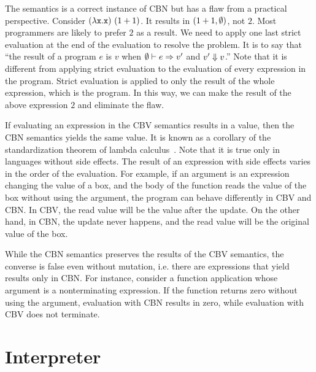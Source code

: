 The semantics is a correct instance of CBN but has a flaw from a practical
perspective. Consider $(\lambda\texttt{x}.\texttt{x})\ (1+1)$. It results in
$(1+1,\emptyset)$, not $2$. Most programmers are likely to prefer
$2$ as a result. We need to apply one last strict evaluation at the end of the
evaluation to resolve the problem. It is to say that ``the result of a program
$e$ is $v$ when $\emptyset\vdash e\Rightarrow v'$ and $v'\Downarrow v$.'' Note that it is
different from applying strict evaluation to the evaluation of every expression
in the program. Strict evaluation is applied to only the result of the whole
expression, which is the program. In this way, we can make the result of the
above expression $2$ and eliminate the flaw.

If evaluating an expression in the CBV semantics results in a value,
then the CBN semantics yields the same value. It is known as a corollary of the
standardization theorem of lambda calculus~\cite{theories-of-pl}.
Note that it is true only in languages without side effects.
The result of an expression with side effects varies in the order of
the evaluation. For example, if an argument is an expression changing the value
of a box, and the body of the function reads the value of the box without using
the argument, the program can behave differently in CBV and CBN. In CBV, the
read value will be the value after the update. On the other hand, in CBN, the
update never happens, and the read value will be the original value of the box.

While the CBN semantics preserves the results of the CBV semantics,
the converse is false even without mutation, i.e. there are expressions that
yield results only in CBN.
For instance, consider a function application whose argument is a nonterminating
expression. If the function returns zero without using the argument, evaluation
with CBN results in zero, while evaluation with CBV does not terminate.

\section{Interpreter}


